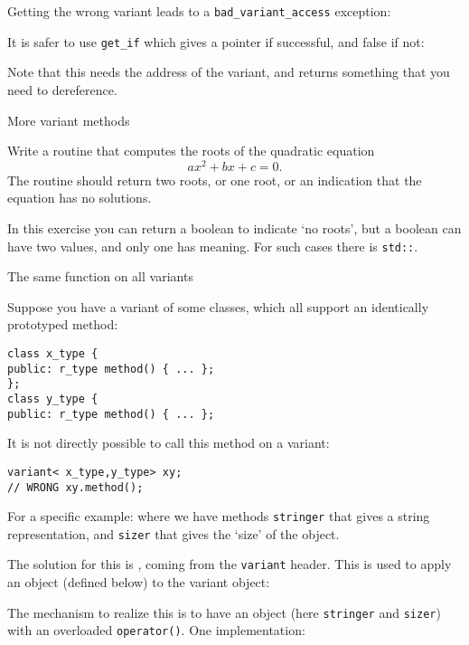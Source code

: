 Getting the wrong variant leads to a \lstinline{bad_variant_access} exception:

It is safer to use \lstinline{get_if} which gives a pointer
if successful, and false if not:

Note that this needs the address of the variant, and returns
something that you need to dereference.

\begin{slide}{More variant methods}
  \label{sl:cpp-variant}
\end{slide}

\begin{exercise}
  \label{ex:quad-roots}
  Write a routine that computes the roots of the quadratic equation
  \[ ax^2+bx+c=0. \]
  The routine should return two roots, or one root, or an indication
  that the equation has no solutions.
\end{exercise}

In this exercise you can return a boolean to indicate `no roots', but
a boolean can have two values, and only one has meaning. For such
cases there is \lstinline{std::}.

 {The same function on all variants}

Suppose you have a variant of some classes,
which all support an identically prototyped method:
\begin{lstlisting}
class x_type {
public: r_type method() { ... };
};
class y_type {
public: r_type method() { ... };
\end{lstlisting}
It is not directly possible to call this method on a variant:
\begin{lstlisting}
variant< x_type,y_type> xy;
// WRONG xy.method();
\end{lstlisting}

For a specific example:
%
%
where we have methods
\lstinline{stringer} that gives a string representation, and
\lstinline{sizer} that gives the `size' of the object.

The solution for this is ,
coming from the \lstinline+variant+ header.
This is used to apply an object (defined below) to the variant object:
%

The mechanism to realize this is to have an object
(here \lstinline{stringer} and \lstinline{sizer})
with an overloaded \lstinline+operator()+.
One implementation:
%


